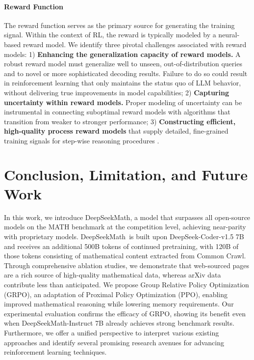 \begin{itemize}[topsep=0pt]
\begin{itemize}[topsep=0pt]
\paragraph{Reward Function} The reward function serves as the primary source for generating the training signal. Within the context of RL, the reward is typically modeled by a neural-based reward model. We identify three pivotal challenges associated with reward models: 1) \textbf{Enhancing the generalization capacity of reward models.} A robust reward model must generalize well to unseen, out-of-distribution queries and to novel or more sophisticated decoding results. Failure to do so could result in reinforcement learning that only maintains the status quo of LLM behavior, without delivering true improvements in model capabilities; 2) \textbf{Capturing uncertainty within reward models.} Proper modeling of uncertainty can be instrumental in connecting suboptimal reward models with algorithms that transition from weaker to stronger performance; 3) \textbf{Constructing efficient, high-quality process reward models} that supply detailed, fine-grained training signals for step-wise reasoning procedures \citep{lightman2023let,wang2023math}.

\section{Conclusion, Limitation, and Future Work}  
In this work, we introduce DeepSeekMath, a model that surpasses all open-source models on the MATH benchmark at the competition level, achieving near-parity with proprietary models. DeepSeekMath~is built upon DeepSeek-Coder-v1.5 7B and receives an additional 500B tokens of continued pretraining, with 120B of those tokens consisting of mathematical content extracted from Common Crawl. Through comprehensive ablation studies, we demonstrate that web-sourced pages are a rich source of high-quality mathematical data, whereas arXiv data contribute less than anticipated. We propose Group Relative Policy Optimization (GRPO), an adaptation of Proximal Policy Optimization (PPO), enabling improved mathematical reasoning while lowering memory requirements. Our experimental evaluation confirms the efficacy of GRPO, showing its benefit even when DeepSeekMath-Instruct 7B already achieves strong benchmark results. Furthermore, we offer a unified perspective to interpret various existing approaches and identify several promising research avenues for advancing reinforcement learning techniques.


\end{itemize}
\end{itemize}
